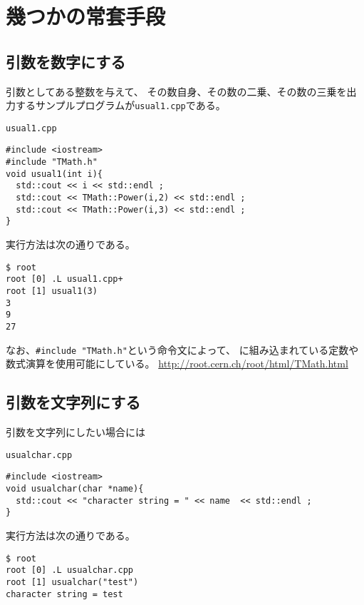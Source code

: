 \clearpage
 \section{幾つかの常套手段}
 
 
  \subsection{引数を数字にする}
  引数としてある整数を与えて、
  その数自身、その数の二乗、その数の三乗を出力するサンプルプログラムが\verb|usual1.cpp|である。
  \begin{itembox}{\texttt{usual1.cpp}}
\begin{verbatim}
#include <iostream>
#include "TMath.h"
void usual1(int i){
  std::cout << i << std::endl ;
  std::cout << TMath::Power(i,2) << std::endl ;
  std::cout << TMath::Power(i,3) << std::endl ;
}
\end{verbatim}
  \end{itembox}
実行方法は次の通りである。
\begin{verbatim}
$ root
root [0] .L usual1.cpp+
root [1] usual1(3)
3
9
27
\end{verbatim}
なお、\verb|#include "TMath.h"|という命令文によって、
\ROOT に組み込まれている定数や数式演算を使用可能にしている。
\url{http://root.cern.ch/root/html/TMath.html}


  \subsection{引数を文字列にする}
  引数を文字列にしたい場合には
  \begin{itembox}{\texttt{usualchar.cpp}}
\begin{verbatim}
#include <iostream>
void usualchar(char *name){
  std::cout << "character string = " << name  << std::endl ;
}
\end{verbatim}
  \end{itembox}
実行方法は次の通りである。
\begin{verbatim}
$ root
root [0] .L usualchar.cpp 
root [1] usualchar("test")
character string = test
\end{verbatim}


